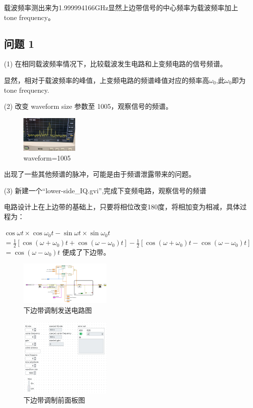 \documentclass{../source/Experiment}
\begin{document}
载波频率测出来为1.999994166GHz显然上边带信号的中心频率为载波频率加上tone frequency。
\subsection{问题 1}
(1) 在相同载波频率情况下，比较载波发生电路和上变频电路的信号频谱。

显然，相对于载波频率的峰值，上变频电路的频谱峰值对应的频率高$\omega_0$,此$\omega_0$即为tone frequency.

(2) 改变 waveform size 参数至 1005，观察信号的频谱。

\begin{figure}[H]
    \centering
    \includegraphics[width = 0.25\textwidth]{lab9/wave.png}
    \caption{waveform=1005}
\end{figure}
出现了一些其他频谱的脉冲，可能是由于频谱泄露带来的问题。

(3) 新建一个“lower-side\_IQ.gvi”,完成下变频电路，观察信号的频谱

电路设计上在上边带的基础上，只要将相位改变180度，将相加变为相减，具体过程为：

$\cos \omega t \times \cos \omega_{0} t-\sin \omega t \times \sin \omega_{0} t$
$=\frac{1}{2}\left[\cos \left(\omega+\omega_{0}\right) t+\cos \left(\omega-\omega_{0}\right) t\right]-\frac{1}{2}\left[\cos \left(\omega+\omega_{0}\right) t-\cos \left(\omega-\omega_{0}\right) t\right]$
$=\cos \left(\omega-\omega_{0}\right) t$
便成了下边带。
\begin{figure}[H]
    \centering
    \includegraphics[width = 0.4\textwidth]{lab9/lower-side_IQ-a.jpg}
    \caption{下边带调制发送电路图}
\end{figure}
\begin{figure}[H]
    \centering
    \includegraphics[width = 0.4\textwidth]{lab9/lower-side_IQ-b.jpg}
    \caption{下边带调制前面板图}
\end{figure}
\end{document}
